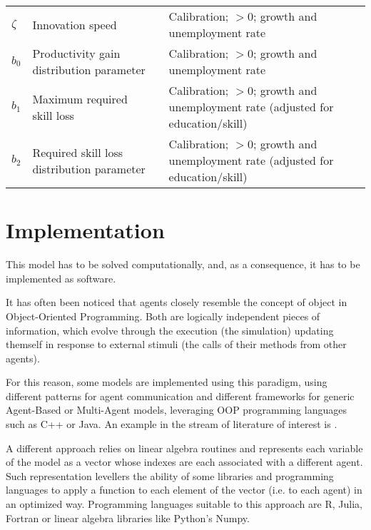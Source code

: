 \documentclass[a4paper, headings=standardclasses]{scrartcl}
\numberwithin{equation}{subsection}
\begin{document}
\begin{xltabular}{\linewidth}{lXlX}
    $\zeta$                      & Innovation speed                                             &       & Calibration; $>0$; growth and unemployment rate                                                                                                                                                            \\
    $b_0$                        & Productivity gain distribution parameter                     &       & Calibration; $>0$; growth and unemployment rate                                                                                                                                                               \\
    $b_1$                        & Maximum required skill loss                                  &       & Calibration; $>0$; growth and unemployment rate (adjusted for education/skill)                                                                                                                                                              \\
    $b_2$                        & Required skill loss distribution parameter                   &       &  Calibration; $>0$; growth and unemployment rate (adjusted for education/skill) \\
\end{xltabular}

\theendnotes

\section{Implementation}
This model has to be solved computationally, and, as a consequence, it has to be implemented as software.

It has often been noticed that agents closely resemble the concept of object in Object-Oriented Programming. Both are logically independent pieces of information, which evolve through the execution (the simulation) updating themself in response to external stimuli (the calls of their methods from other agents).

For this reason, some models are implemented using this paradigm, using different patterns for agent communication and different frameworks for generic Agent-Based or Multi-Agent models, leveraging OOP programming languages such as C++ or Java. An example in the stream of literature of interest is \textcite{caiani2016}.

A different approach relies on linear algebra routines and represents each variable of the model as a vector whose indexes are each associated with a different agent. Such representation levellers the ability of some libraries and programming languages to apply a function to each element of the vector (i.e. to each agent) in an optimized way. Programming languages suitable to this approach are R, Julia, Fortran or linear algebra libraries like Python's Numpy.
\end{document}
